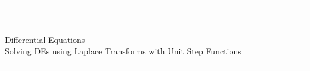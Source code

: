 \documentclass[12pt]{article}
\newcommand{\<}{\langle}
\renewcommand{\>}{\rangle}
\begin{document}
\noindent\rule{7in}{0.4pt}\\
\begin{center}
{\sc Differential Equations\\
Solving DEs using Laplace Transforms with Unit Step Functions}
\end{center}
\noindent\rule{7in}{0.4pt}








\end{document}

